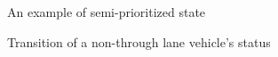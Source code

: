 \documentclass[10pt, conference, compsocconf]{IEEEtran}
\begin{document}
\begin{figure}[h]
	\begin{center}
	\end{center}
	\caption{An example of semi-prioritized state}
	\label{space}
\end{figure}

\begin{figure}[h]
\begin{center}
\end{center}
\caption{Transition of a non-through lane vehicle's status}
\label{nonThroughLaneStatus}
\end{figure}
\end{document}

